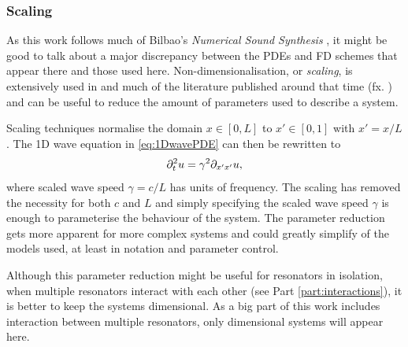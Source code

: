 \subsubsection{Scaling}
As this work follows much of Bilbao's \textit{Numerical Sound Synthesis} \cite{theBible}, it might be good to talk about a major discrepancy between the PDEs and FD schemes that appear there and those used here. Non-dimensionalisation, or \textit{scaling}, is extensively used in \cite{theBible} and much of the literature published around that time (fx. \cite{Bilbao2009Modular,Bilbao2009spring}) and can be useful to reduce the amount of parameters used to describe a system.

Scaling techniques normalise the domain $x\in[0, L]$ to $x' \in [0, 1]$ with $x' = x/L$ . The 1D wave equation in \eqref{eq:1DwavePDE} can then be rewritten to
\begin{equation}\label{eq:scaled1Dwave}
    \partial_t^2 u = \gamma^2\partial_{x'x'}u,
\end{equation}
where scaled wave speed $\gamma = c/L$ has units of frequency. The scaling has removed the necessity for both $c$ and $L$ and simply specifying the scaled wave speed $\gamma$ is enough to parameterise the behaviour of the system. The parameter reduction gets more apparent for more complex systems and could greatly simplify of the models used, at least in notation and parameter control. 

Although this parameter reduction might be useful for resonators in isolation, when multiple resonators interact with each other (see Part \ref{part:interactions}), it is better to keep the systems dimensional. As a big part of this work includes interaction between multiple resonators, only dimensional systems will appear here.

